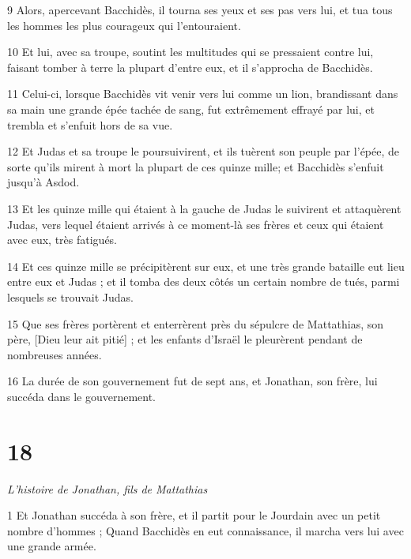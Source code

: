 \par 9 Alors, apercevant Bacchidès, il tourna ses yeux et ses pas vers lui, et tua tous les hommes les plus courageux qui l'entouraient.

\par 10 Et lui, avec sa troupe, soutint les multitudes qui se pressaient contre lui, faisant tomber à terre la plupart d'entre eux, et il s'approcha de Bacchidès.

\par 11 Celui-ci, lorsque Bacchidès vit venir vers lui comme un lion, brandissant dans sa main une grande épée tachée de sang, fut extrêmement effrayé par lui, et trembla et s'enfuit hors de sa vue.

\par 12 Et Judas et sa troupe le poursuivirent, et ils tuèrent son peuple par l'épée, de sorte qu'ils mirent à mort la plupart de ces quinze mille; et Bacchidès s'enfuit jusqu'à Asdod.

\par 13 Et les quinze mille qui étaient à la gauche de Judas le suivirent et attaquèrent Judas, vers lequel étaient arrivés à ce moment-là ses frères et ceux qui étaient avec eux, très fatigués.

\par 14 Et ces quinze mille se précipitèrent sur eux, et une très grande bataille eut lieu entre eux et Judas ; et il tomba des deux côtés un certain nombre de tués, parmi lesquels se trouvait Judas.

\par 15 Que ses frères portèrent et enterrèrent près du sépulcre de Mattathias, son père, [Dieu leur ait pitié] ; et les enfants d'Israël le pleurèrent pendant de nombreuses années.

\par 16 La durée de son gouvernement fut de sept ans, et Jonathan, son frère, lui succéda dans le gouvernement.

\chapter{18}

\par \textit{L'histoire de Jonathan, fils de Mattathias}

\par 1 Et Jonathan succéda à son frère, et il partit pour le Jourdain avec un petit nombre d'hommes ; Quand Bacchidès en eut connaissance, il marcha vers lui avec une grande armée.


